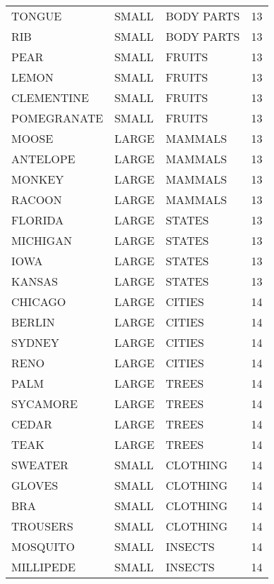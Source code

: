 \begin{tabular}{lllr}
      TONGUE & SMALL &       BODY PARTS &       13 \\
         RIB & SMALL &       BODY PARTS &       13 \\
        PEAR & SMALL &           FRUITS &       13 \\
       LEMON & SMALL &           FRUITS &       13 \\
  CLEMENTINE & SMALL &           FRUITS &       13 \\
 POMEGRANATE & SMALL &           FRUITS &       13 \\
       MOOSE & LARGE &          MAMMALS &       13 \\
    ANTELOPE & LARGE &          MAMMALS &       13 \\
      MONKEY & LARGE &          MAMMALS &       13 \\
      RACOON & LARGE &          MAMMALS &       13 \\
     FLORIDA & LARGE &           STATES &       13 \\
    MICHIGAN & LARGE &           STATES &       13 \\
        IOWA & LARGE &           STATES &       13 \\
      KANSAS & LARGE &           STATES &       13 \\
     CHICAGO & LARGE &           CITIES &       14 \\
      BERLIN & LARGE &           CITIES &       14 \\
      SYDNEY & LARGE &           CITIES &       14 \\
        RENO & LARGE &           CITIES &       14 \\
        PALM & LARGE &            TREES &       14 \\
    SYCAMORE & LARGE &            TREES &       14 \\
       CEDAR & LARGE &            TREES &       14 \\
        TEAK & LARGE &            TREES &       14 \\
     SWEATER & SMALL &         CLOTHING &       14 \\
      GLOVES & SMALL &         CLOTHING &       14 \\
         BRA & SMALL &         CLOTHING &       14 \\
    TROUSERS & SMALL &         CLOTHING &       14 \\
    MOSQUITO & SMALL &          INSECTS &       14 \\
   MILLIPEDE & SMALL &          INSECTS &       14 \\

\end{tabular}
